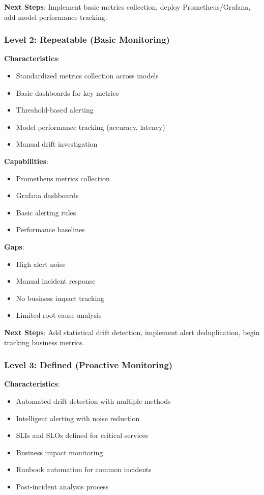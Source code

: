 \textbf{Next Steps}: Implement basic metrics collection, deploy Prometheus/Grafana, add model performance tracking.

\subsubsection{Level 2: Repeatable (Basic Monitoring)}

\textbf{Characteristics}:
\begin{itemize}
    \item Standardized metrics collection across models
    \item Basic dashboards for key metrics
    \item Threshold-based alerting
    \item Model performance tracking (accuracy, latency)
    \item Manual drift investigation
\end{itemize}

\textbf{Capabilities}:
\begin{itemize}
    \item Prometheus metrics collection
    \item Grafana dashboards
    \item Basic alerting rules
    \item Performance baselines
\end{itemize}

\textbf{Gaps}:
\begin{itemize}
    \item High alert noise
    \item Manual incident response
    \item No business impact tracking
    \item Limited root cause analysis
\end{itemize}

\textbf{Next Steps}: Add statistical drift detection, implement alert deduplication, begin tracking business metrics.

\subsubsection{Level 3: Defined (Proactive Monitoring)}

\textbf{Characteristics}:
\begin{itemize}
    \item Automated drift detection with multiple methods
    \item Intelligent alerting with noise reduction
    \item SLIs and SLOs defined for critical services
    \item Business impact monitoring
    \item Runbook automation for common incidents
    \item Post-incident analysis process
\end{itemize}

